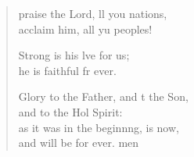 \begin{verse}
  \begin{patverse}
     praise the Lord, ll you nations,\Med\\
acclaim him, all yu peoples!

Strong is his lve for us;\Med\\
he is faithful fr ever.

Glory to the Father, and t the Son,\Med\\
and to the Hol Spirit:\\
as it was in the beginn\pointup{\i}ng, is now,\Med\\
and will be for ever. men
  \end{patverse}
\end{verse}

